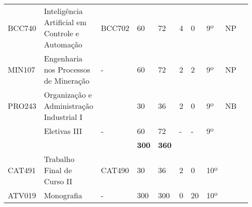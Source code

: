 \begin{table}[]
{\begin{tabular}{l|l|l|l|l|l|l|l|l|l}
			\multicolumn{1}{|l|}{BCC740}                        & Inteligência Artificial em Controle e Automação          & BCC702                        & 60                                                           & 72                         & 4                        & 0                         & 9º                         & NP                      &  \\ \cline{1-9}
			\multicolumn{1}{|l|}{MIN107}                        & Engenharia nos Processos de Mineração                    & -                             & 60                                                           & 72                         & 2                        & 2                         & 9º                         & NP                      &  \\ \cline{1-9}
			\multicolumn{1}{|l|}{PRO243}                        & Organização e Administração Industrial I                 &                               & 30                                                           & 36                         & 2                        & 0                         & 9º                         & NB                      &  \\ \cline{1-9}
			\multicolumn{1}{|l|}{}                              & {\color[HTML]{009901} Eletivas III}                      & {\color[HTML]{009901} -}      & {\color[HTML]{009901} 60}                                    & {\color[HTML]{009901} 72}  & {\color[HTML]{009901} -} & {\color[HTML]{009901} -}  & {\color[HTML]{009901} 9º}  & {\color[HTML]{009901} } &  \\ \cline{1-9}
			\multicolumn{1}{|l|}{}                              &                                                          &                               & \textbf{300}                                                 & \textbf{360}               &                          &                           &                            &                         &  \\ \cline{1-9}
			\multicolumn{1}{|l|}{{\color[HTML]{3531FF} CAT491}} & {\color[HTML]{3531FF} Trabalho Final de Curso II}        & {\color[HTML]{3531FF} CAT490} & {\color[HTML]{3531FF} 30}                                    & {\color[HTML]{3531FF} 36}  & {\color[HTML]{3531FF} 2} & {\color[HTML]{3531FF} 0}  & {\color[HTML]{3531FF} 10º} & {\color[HTML]{3531FF} } &  \\ \cline{1-9}
			\multicolumn{1}{|l|}{{\color[HTML]{3531FF} ATV019}} & {\color[HTML]{3531FF} Monografia}                        & {\color[HTML]{3531FF} -}      & {\color[HTML]{3531FF} 300}                                   & {\color[HTML]{3531FF} 300} & {\color[HTML]{3531FF} 0} & {\color[HTML]{3531FF} 20} & {\color[HTML]{3531FF} 10º} & {\color[HTML]{3531FF} } &  \\ \cline{1-9}

\end{tabular}}
\end{table}

